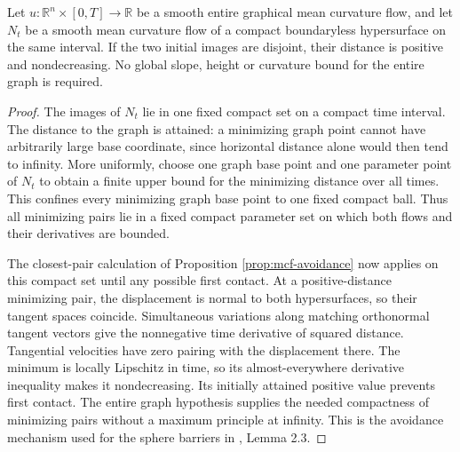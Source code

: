 \begin{lemma}\label{lem:compact-flow-entire-graph-avoidance}
Let $u:\mathbb R^n\times[0,T]\to\mathbb R$ be a smooth entire graphical mean curvature flow, and let $N_t$ be a smooth mean curvature flow of a compact boundaryless hypersurface on the same interval. If the two initial images are disjoint, their distance is positive and nondecreasing. No global slope, height or curvature bound for the entire graph is required.
\end{lemma}
\begin{proof}
The images of $N_t$ lie in one fixed compact set on a compact time interval. The distance to the graph is attained: a minimizing graph point cannot have arbitrarily large base coordinate, since horizontal distance alone would then tend to infinity. More uniformly, choose one graph base point and one parameter point of $N_t$ to obtain a finite upper bound for the minimizing distance over all times. This confines every minimizing graph base point to one fixed compact ball. Thus all minimizing pairs lie in a fixed compact parameter set on which both flows and their derivatives are bounded.

The closest-pair calculation of Proposition \ref{prop:mcf-avoidance} now applies on this compact set until any possible first contact. At a positive-distance minimizing pair, the displacement is normal to both hypersurfaces, so their tangent spaces coincide. Simultaneous variations along matching orthonormal tangent vectors give the nonnegative time derivative of squared distance. Tangential velocities have zero pairing with the displacement there. The minimum is locally Lipschitz in time, so its almost-everywhere derivative inequality makes it nondecreasing. Its initially attained positive value prevents first contact. The entire graph hypothesis supplies the needed compactness of minimizing pairs without a maximum principle at infinity. This is the avoidance mechanism used for the sphere barriers in \cite{Wang09}, Lemma 2.3.
\end{proof}

